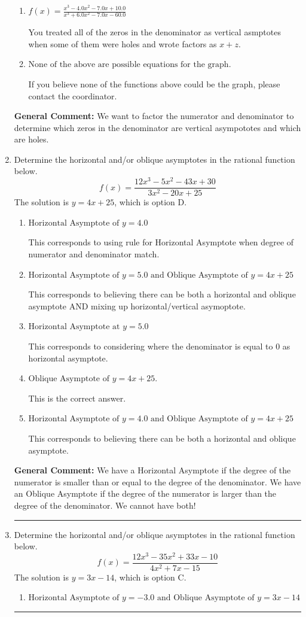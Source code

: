 \documentclass{extbook}[14pt]
\newcommand{\litem}[1]{\item #1

\rule{\textwidth}{0.4pt}}
\begin{document}
\begin{enumerate}
{\begin{enumerate}[label=\Alph*.]
Remember that factors are written as $x-z$. For example, the zero $x=4$ corresponds to the factor $x-(4)$.
\item \( f(x)=\frac{x^{3} -4.0 x^{2} -7.0 x + 10.0}{x^{3} +6.0 x^{2} -7.0 x -60.0} \)

You treated all of the zeros in the denominator as vertical asmptotes when some of them were holes and wrote factors as $x+z$.
\item \( \text{None of the above are possible equations for the graph.} \)

If you believe none of the functions above could be the graph, please contact the coordinator.
\end{enumerate}

\textbf{General Comment:} We want to factor the numerator and denominator to determine which zeros in the denominator are vertical asympototes and which are holes.
}
\litem{
Determine the horizontal and/or oblique asymptotes in the rational function below.
\[ f(x) = \frac{12x^{3} -5 x^{2} -43 x + 30}{3x^{2} -20 x + 25} \]The solution is \( y = 4x + 25 \), which is option D.\begin{enumerate}[label=\Alph*.]
\item \( \text{Horizontal Asymptote of } y = 4.0  \)

This corresponds to using rule for Horizontal Asymptote when degree of numerator and denominator match.
\item \( \text{Horizontal Asymptote of } y = 5.0 \text{ and Oblique Asymptote of } y = 4x + 25 \)

This corresponds to believing there can be both a horizontal and oblique asymptote AND mixing up horizontal/vertical asymoptote.
\item \( \text{Horizontal Asymptote at } y = 5.0 \)

This corresponds to considering where the denominator is equal to 0 as horizontal asymptote.
\item \( \text{Oblique Asymptote of } y = 4x + 25. \)

This is the correct answer.
\item \( \text{Horizontal Asymptote of } y = 4.0 \text{ and Oblique Asymptote of } y = 4x + 25 \)

This corresponds to believing there can be both a horizontal and oblique asymptote.
\end{enumerate}

\textbf{General Comment:} We have a Horizontal Asymptote if the degree of the numerator is smaller than or equal to the degree of the denominator. We have an Oblique Asymptote if the degree of the numerator is larger than the degree of the denominator. We cannot have both!
}
\litem{
Determine the horizontal and/or oblique asymptotes in the rational function below.
\[ f(x) = \frac{12x^{3} -35 x^{2} +33 x -10}{4x^{2} +7 x -15} \]The solution is \( y = 3x -14 \), which is option C.\begin{enumerate}[label=\Alph*.]
\item \( \text{Horizontal Asymptote of } y = -3.0 \text{ and Oblique Asymptote of } y = 3x -14 \)


\end{enumerate}}
\end{enumerate}
\end{document}
